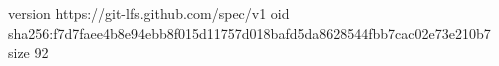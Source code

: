 version https://git-lfs.github.com/spec/v1
oid sha256:f7d7faee4b8e94ebb8f015d11757d018bafd5da8628544fbb7cac02e73e210b7
size 92
